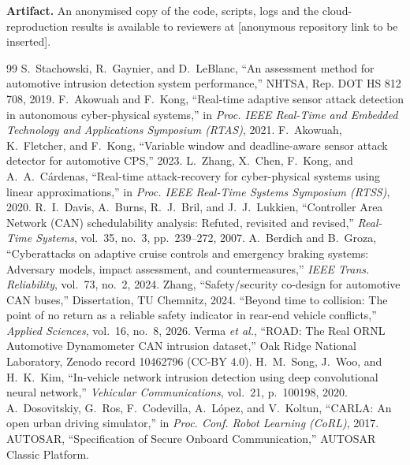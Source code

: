 \documentclass[conference]{IEEEtran}
\begin{document}
\textbf{Artifact.} An anonymised copy of the code, scripts, logs and the cloud-reproduction results is available to reviewers at [anonymous repository link to be inserted].

\begin{thebibliography}{99}
 S.~Stachowski, R.~Gaynier, and D.~LeBlanc, ``An assessment method for automotive intrusion detection system performance,'' NHTSA, Rep. DOT HS 812 708, 2019.
 F.~Akowuah and F.~Kong, ``Real-time adaptive sensor attack detection in autonomous cyber-physical systems,'' in \emph{Proc. IEEE Real-Time and Embedded Technology and Applications Symposium (RTAS)}, 2021.
 F.~Akowuah, K.~Fletcher, and F.~Kong, ``Variable window and deadline-aware sensor attack detector for automotive CPS,'' 2023.
 L.~Zhang, X.~Chen, F.~Kong, and A.~A.~C\'ardenas, ``Real-time attack-recovery for cyber-physical systems using linear approximations,'' in \emph{Proc. IEEE Real-Time Systems Symposium (RTSS)}, 2020.
 R.~I.~Davis, A.~Burns, R.~J.~Bril, and J.~J.~Lukkien, ``Controller Area Network (CAN) schedulability analysis: Refuted, revisited and revised,'' \emph{Real-Time Systems}, vol.~35, no.~3, pp.~239--272, 2007.
 A.~Berdich and B.~Groza, ``Cyberattacks on adaptive cruise controls and emergency braking systems: Adversary models, impact assessment, and countermeasures,'' \emph{IEEE Trans. Reliability}, vol.~73, no.~2, 2024.
 Zhang, ``Safety/security co-design for automotive CAN buses,'' Dissertation, TU Chemnitz, 2024.
 ``Beyond time to collision: The point of no return as a reliable safety indicator in rear-end vehicle conflicts,'' \emph{Applied Sciences}, vol.~16, no.~8, 2026.
 Verma \emph{et al.}, ``ROAD: The Real ORNL Automotive Dynamometer CAN intrusion dataset,'' Oak Ridge National Laboratory, Zenodo record 10462796 (CC-BY 4.0).
 H.~M.~Song, J.~Woo, and H.~K.~Kim, ``In-vehicle network intrusion detection using deep convolutional neural network,'' \emph{Vehicular Communications}, vol.~21, p.~100198, 2020.
 A.~Dosovitskiy, G.~Ros, F.~Codevilla, A.~L\'opez, and V.~Koltun, ``CARLA: An open urban driving simulator,'' in \emph{Proc. Conf. Robot Learning (CoRL)}, 2017.
 AUTOSAR, ``Specification of Secure Onboard Communication,'' AUTOSAR Classic Platform.
\end{thebibliography}
\end{document}
